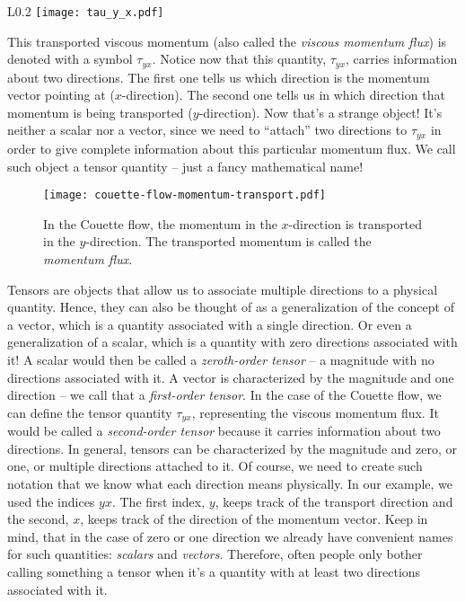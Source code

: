 \documentclass[10pt,twocolumn]{article}
\begin{document}
\begin{wrapfigure}{L}{0.2\textwidth}
\centering\texttt{[image: tau\_y\_x.pdf]}
\label{fig:tau_y_x}
\end{wrapfigure}
This transported viscous momentum (also called the \textit{viscous momentum flux}) is denoted with a symbol $\tau_{yx}$. Notice now that this quantity, $\tau_{yx}$, carries information about two directions. The first one tells us which direction is the momentum vector pointing at ($x$-direction). The second one tells us in which direction that momentum is being transported ($y$-direction). Now that's a strange object! It's neither a scalar nor a vector, since we need to ``attach'' two directions to $\tau_{yx}$ in order to give complete information about this particular momentum flux. We call such object a tensor quantity -- just a fancy mathematical name!
\begin{figure}[t!]
\centering\texttt{[image: couette-flow-momentum-transport.pdf]}
\caption{In the Couette flow, the momentum in the $x$-direction is transported in the $y$-direction. The transported momentum is called the \textit{momentum flux}.}
\label{fig:couette-flow-momentum-transport}
\end{figure}

Tensors are objects that allow us to associate multiple directions to a physical quantity. Hence, they can also be thought of as a generalization of the concept of a vector, which is a quantity associated with a single direction. Or even a generalization of a scalar, which is a quantity with zero directions associated with it! A scalar would then be called a \textit{zeroth-order tensor} -- a magnitude with no directions associated with it. A vector is characterized by the magnitude and one direction -- we call that a \textit{first-order tensor}. In the case of the Couette flow, we can define the tensor quantity $\tau_{yx}$, representing the viscous momentum flux. It would be called a \textit{second-order tensor} because it carries information about two directions. In general, tensors can be characterized by the magnitude and zero, or one, or multiple directions attached to it. Of course, we need to create such notation that we know what each direction means physically. In our example, we used the indices $yx$. The first index, $y$, keeps track of the transport direction and the second, $x$, keeps track of the direction of the momentum vector. Keep in mind, that in the case of zero or one direction we already have convenient names for such quantities: \textit{scalars} and \textit{vectors}. Therefore, often people only bother calling something a tensor when it's a quantity with at least two directions associated with it.
\end{document}

